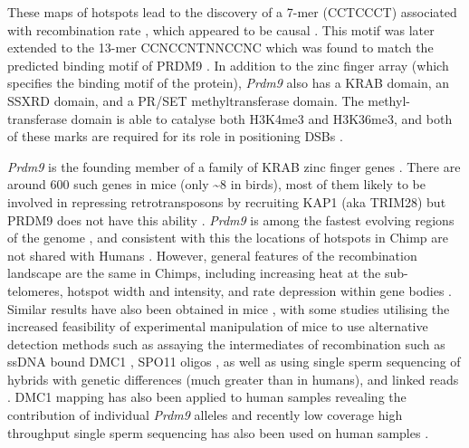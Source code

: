These maps of hotspots lead to the discovery of a 7-mer (CCTCCCT) associated with recombination rate \parencite{Myers2005FineScale}, which appeared to be causal \parencite{Jeffreys2002Reciprocal}.
This motif was later extended to the 13-mer CCNCCNTNNCCNC \parencite{Myers2008common} which was found to match the predicted binding motif of PRDM9 \parencite{Myers2010Drive, Baudat2010PRDM9, Parvanov2010Prdm9, Berg2010PRDM9}.
In addition to the zinc finger array (which specifies the binding motif of the protein), \textit{Prdm9} also has a KRAB domain, an SSXRD domain, and a PR/SET methyltransferase domain.
The methyl-transferase domain is able to catalyse both H3K4me3 and H3K36me3, and both of these marks are required for its role in positioning DSBs \parencite{Powers2016Meiotic, Diagouraga2018PRDM9}.

\textit{Prdm9} is the founding member of a family of KRAB zinc finger genes \parencite{Birtle2006Meisetz}.
There are around 600 such genes in mice (only \textasciitilde8 in birds), most of them likely to be involved in repressing retrotransposons by recruiting KAP1 (aka TRIM28) but PRDM9 does not have this ability \parencite{Imbeault2017KRAB, Bruno2019Arms}.
\textit{Prdm9} is among the fastest evolving regions of the genome \parencite{Oliver2009Accelerated}, and consistent with this the locations of hotspots in Chimp are not shared with Humans \parencite{Wall2003Comparative, Ptak2004Absence, Ptak2005Finescale, Winckler2005Comparison}.
However, general features of the recombination landscape are the same in Chimps, including increasing heat at the sub-telomeres, hotspot width and intensity, and rate depression within gene bodies \parencite{Auton2012FineScale}.
Similar results have also been obtained in mice \parencite{Paigen2008Recombinational, Brunschwig2012FineScale, Booker2017Recombination}, with some studies utilising the increased feasibility of experimental manipulation of mice to use alternative detection methods such as assaying the intermediates of recombination such as ssDNA bound DMC1 \parencite{Smagulova2011Genomewide, Khil2012Sensitive, Smagulova2016evolutionary}, SPO11 oligos \parencite{Lange2016Landscape}, as well as using single sperm sequencing of hybrids with genetic differences (much greater than in humans)\parencite{Hinch2019Factors}, and linked reads \parencite{Dreau2019Genomewide}.
DMC1 mapping has also been applied to human samples revealing the contribution of individual \textit{Prdm9} alleles \parencite{Pratto2014Recombination} and recently low coverage high throughput single sperm sequencing has also been used on human samples \parencite{Bell2019Insights}.

